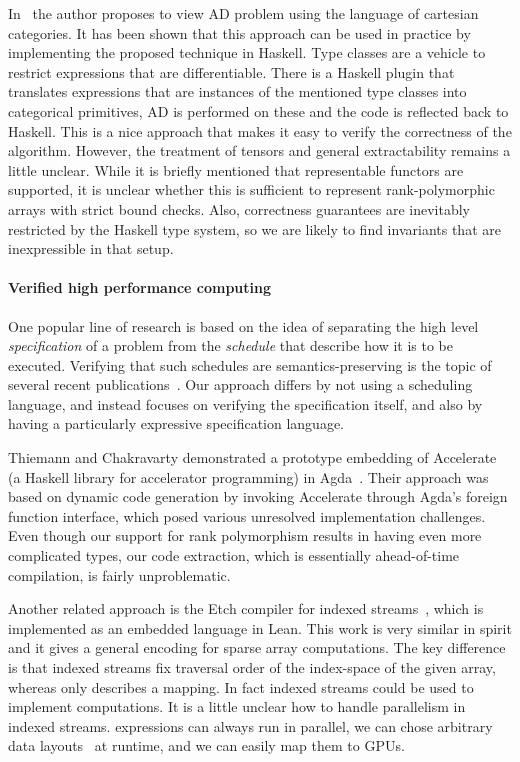In~\cite{ad-elliott} the author proposes to view AD problem using
the language of cartesian categories.  It has been shown that
this approach can be used in practice by implementing the proposed
technique in Haskell.  Type classes are a vehicle to restrict expressions
that are differentiable.  There is a Haskell plugin that translates
expressions that are instances of the mentioned type classes into
categorical primitives, AD is performed on these and the code is reflected
back to Haskell.  This is a nice approach that makes it easy
to verify the correctness of the algorithm.  However, the treatment
of tensors and general extractability remains a little unclear.
While it is briefly mentioned that representable functors
are supported, it is unclear whether this is sufficient to
represent rank-polymorphic arrays with strict bound checks.
Also, correctness guarantees are inevitably restricted by the
Haskell type system, so we are likely to find invariants that
are inexpressible in that setup.

\paragraph{Verified high performance computing}

One popular line of research is based on the idea of separating the
high level \emph{specification} of a problem from the \emph{schedule}
that describe how it is to be executed. Verifying that such schedules
are semantics-preserving is the topic of several recent
publications~\cite{10.1145/3527328,10.1145/3498717}. Our approach
differs by not using a scheduling language, and instead focuses on
verifying the specification itself, and also by having a particularly
expressive specification language.

Thiemann and Chakravarty demonstrated a prototype embedding of
Accelerate~\cite{10.1145/1926354.1926358} (a Haskell library for
accelerator programming) in Agda~\cite{thiemann2013agda}. Their
approach was based on dynamic code generation by invoking Accelerate
through Agda's foreign function interface, which posed various
unresolved implementation challenges. Even though our support for rank
polymorphism results in having even more complicated types, our code
extraction, which is essentially ahead-of-time compilation, is fairly
unproblematic.

Another related approach is the Etch compiler for indexed
streams~\cite{10.1145/3591268}, which is implemented as an embedded
language in Lean.  This work is very similar in spirit and it gives
a general encoding for sparse array computations.  The key difference
is that indexed streams fix traversal order of the index-space
of the given array, whereas  only describes a mapping.
In fact indexed streams could be used to implement 
computations.  It is a little unclear how to handle parallelism
in indexed streams.   expressions can always run in parallel,
we can chose arbitrary data layouts~\cite{data-layouts} at runtime,
and we can easily map them to GPUs.


